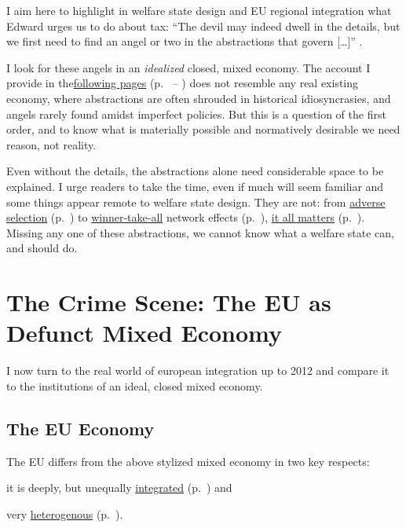 \documentclass[11pt,a4paper,oneside]{article}
\begin{document}
I aim here to highlight in welfare state design and \gls{EU} regional integration what Edward \citeauthor{McCaffery2002} urges us to do about tax: 
``The devil may indeed dwell in the details, but we first need to find an angel or two in the abstractions that govern [\ldots]'' \citeyearpar[117]{McCaffery2002}. 

I look for these angels in an \emph{idealized} closed, mixed economy. 
The account I provide in the\hyperref[sec:mixed-economy]{following pages} (p.~\pageref{sec:mixed-economy} -- \pageref{sec:EU-reality}) does not resemble any real existing economy, where abstractions are often shrouded in historical idiosyncrasies, and angels rarely found amidst imperfect policies. 
But this is a question of the first order, and to know what is materially possible and normatively desirable we need reason, not reality.

Even without the details, the abstractions alone need considerable space to be explained. 
I urge readers to take the time, even if much will seem familiar and some things appear remote to welfare state design. 
They are not: 
from \hyperref[sec:adverse-selection]{adverse selection} (p.~\pageref{sec:adverse-selection}) to \hyperref[sec:winner-take-all]{winner-take-all} network effects (p.~\pageref{sec:winner-take-all}), \hyperref[sec:why-mixed-economy-matters]{it all matters} (p.~\pageref{sec:why-mixed-economy-matters}). 
Missing any one of these abstractions, we cannot know what a welfare state can, and should do.


\section{The Crime Scene: The EU as Defunct Mixed Economy} \label{sec:EU-reality}
I now turn to the real world of european integration up to 2012 and compare it to the institutions of an ideal, closed mixed economy.
	
\subsection{The EU Economy}
The \gls{EU} differs from the above stylized mixed economy in two key respects:
\begin{inparaenum}[1)] 
	\item it is deeply, but unequally \hyperref[sec:EU-Acquis]{integrated} (p.~\pageref{sec:EU-Acquis}) and 
	\item very \hyperref[sec:sources-of-wealth]{heterogenous} (p.~\pageref{sec:sources-of-wealth}).
\end{inparaenum}
\end{document}
